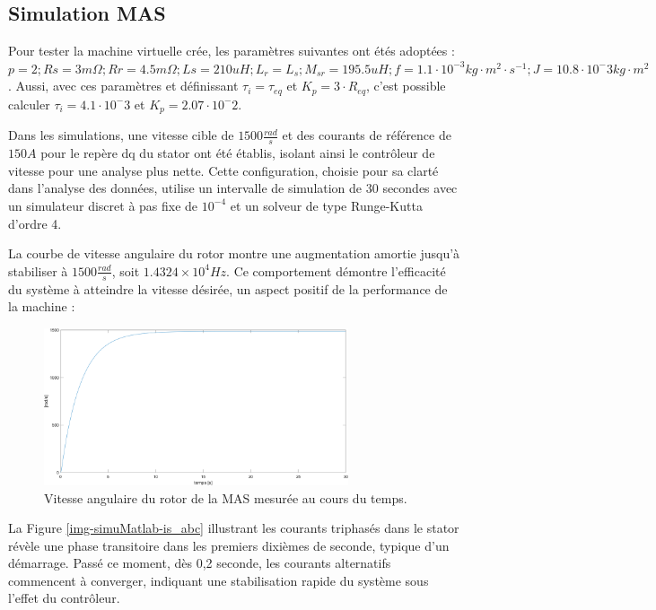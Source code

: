 

\subsection{Simulation MAS}


Pour tester la machine virtuelle crée, les paramètres suivantes ont étés adoptées : $p=2; Rs = 3m\Omega; Rr=4.5m\Omega; Ls=210uH; L_r = L_s; M_{sr}=195.5uH; f=1.1 \cdot 10^{-3} kg\cdot m^2 \cdot s^{-1}; J = 10.8 \cdot 10^-3{kg \cdot m^2}$. Aussi, avec ces paramètres et définissant $\tau_i=\tau_{eq}$ et $K_p = 3 \cdot R_{eq}$, c'est possible calculer $\tau_i = 4.1\cdot 10^-3$ et $K_p = 2.07 \cdot 10^-2$.

Dans les simulations, une vitesse cible de \(1500 \frac{rad}{s}\) et des courants de référence de \(150 A\) pour le repère dq du stator ont été établis, isolant ainsi le contrôleur de vitesse pour une analyse plus nette. Cette configuration, choisie pour sa clarté dans l'analyse des données, utilise un intervalle de simulation de 30 secondes avec un simulateur discret à pas fixe de \(10^{-4}\) et un solveur de type Runge-Kutta d'ordre 4.

La courbe de vitesse angulaire du rotor montre une augmentation amortie jusqu'à stabiliser à \(1500 \frac{rad}{s}\), soit \(1.4324 \times 10^4 Hz\). Ce comportement démontre l'efficacité du système à atteindre la vitesse désirée, un aspect positif de la performance de la machine :


\begin{figure}[!h]
    \centering
    \includegraphics[width=0.8\textwidth]{simusMATLAB/MAS/wm.png} 
    \caption{Vitesse angulaire du rotor de la MAS mesurée au cours du temps.}
    \label{img-simuMatlab-wm}
\end{figure}

La Figure \ref{img-simuMatlab-is_abc} illustrant les courants triphasés dans le stator révèle une phase transitoire dans les premiers dixièmes de seconde, typique d'un démarrage. Passé ce moment, dès 0,2 seconde, les courants alternatifs commencent à converger, indiquant une stabilisation rapide du système sous l'effet du contrôleur.


